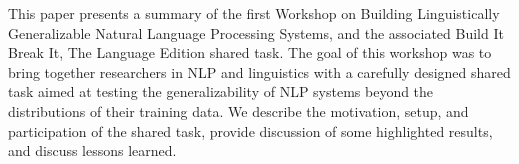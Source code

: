 This paper presents a summary of the first Workshop on Building Linguistically Generalizable Natural Language Processing Systems, and the associated Build It Break It, The Language Edition shared task. The goal of this workshop was to bring together researchers in NLP and linguistics with a carefully designed shared task aimed at testing the generalizability of NLP systems beyond the distributions of their training data. We describe the motivation, setup, and participation of the shared task, provide discussion of some highlighted results, and discuss lessons learned.
